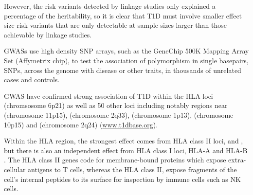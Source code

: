 However, the risk variants detected by linkage studies only explained a percentage of the heritability,
so it is clear that T1D must involve smaller effect size risk variants that are only detectable at sample sizes larger than those achievable by linkage studies.


\Glspl{GWAS} use high density \gls{SNP} arrays, such as the GeneChip 500K Mapping Array Set (Affymetrix chip),
to test the association of polymorphism in single basepairs, \glspl{SNP}, across the genome with disease or other traits,
in thousands of unrelated cases and controls.


\Gls{GWAS} have confirmed strong association of T1D within the \gls{HLA} loci (chromsosome 6p21) as well as 50 other loci including notably regions near
 (chromosome 11p15),  (chromosome 2q33),  (chromosome 1p13),  (chromosome 10p15)
and  (chromosome 2q24) \citep{Nejentsev:2007dv,Burton:2007hta,Barrett:2009jq}
(\url{www.t1dbase.org}).

Within the HLA region, the strongest effect comes from HLA class II loci,  and ,
but there is also an independent effect from HLA class I loci, HLA-A and HLA-B \citep{Howson:2009bl}.
The HLA class II genes code for membrane-bound proteins which expose extra-cellular antigens to T cells,
whereas the HLA class II, expose fragments of the cell's internal peptides to its surface for inspection by immune cells such as \gls{NK} cells.



